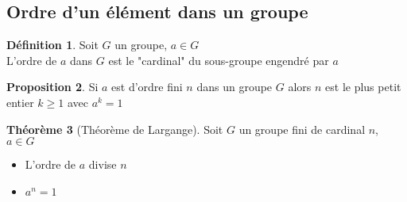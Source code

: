 \documentclass[10pt,a4paper]{article}
\theoremstyle{definition}
\newtheorem{proposition}{Proposition}[section]
\newtheorem{theorem}[proposition]{Théorème}
\newtheorem{definition}[proposition]{Définition}
\begin{document}
\subsection{Ordre d'un élément dans un groupe}
\begin{definition}
Soit $G$ un groupe, $a \in G$ \\
L'ordre de $a$ dans $G$ est le "cardinal" du sous-groupe engendré par $a$
\end{definition}
\begin{proposition}
Si $a$ est d'ordre fini $n$ dans un groupe $G$ alors $n$ est le plus petit entier $k \geq 1$ avec $a^k = 1$
\end{proposition}
\begin{theorem}[Théorème de Largange]
Soit $G$ un groupe fini de cardinal $n$, $a \in G$
\begin{itemize}
\item L'ordre de $a$ divise $n$
\item $a^n = 1$
\end{itemize}
\end{theorem}
\end{document}

